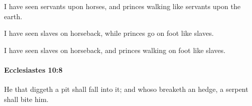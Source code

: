 			\begin{versebox}
					\item[BHS] 
					\item[LXX] 
					\item[ASV] I have seen servants upon horses, and princes walking like servants upon the earth.
					\item[NIV] I have seen slaves on horseback, while princes go on foot like slaves.
					\item[NRSV] I have seen slaves on horseback, and princes walking on foot like slaves.
			\end{versebox}

		\paragraph{Ecclesiastes 10:8} %
			\label{ECCLESIASTES-10-8}

			He that diggeth a pit shall fall into it; and whoso breaketh an hedge, a serpent shall bite him.

